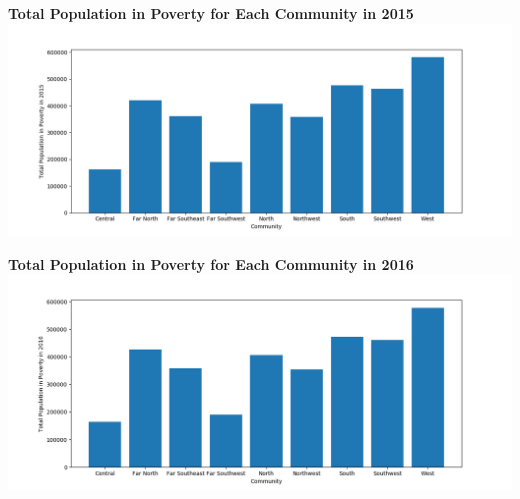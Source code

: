 \documentclass[letterpaper,12pt]{article}
\begin{document}
\newpage 
\noindent \textbf{Total Population in Poverty for Each Community in 2015} \\
\includegraphics[scale=.6]{totalpov15.png}

\noindent \textbf{Total Population in Poverty for Each Community in 2016} \\
\includegraphics[scale=.6]{totalpov16.png}
\end{document}
